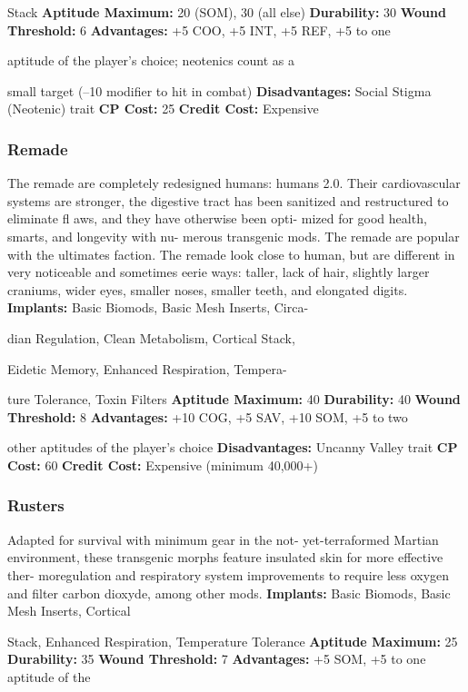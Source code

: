 Stack
\textbf{Aptitude Maximum: }20 (SOM), 30 (all else)
\textbf{Durability: }30
\textbf{Wound Threshold: }6
\textbf{Advantages:  }+5 COO, +5 INT, +5 REF, +5 to one 

aptitude of the player's choice; neotenics count as a 

small target (–10 modifier to hit in combat)
\textbf{Disadvantages: }Social Stigma (Neotenic) trait
\textbf{CP Cost:} 25
\textbf{Credit Cost: }Expensive

\subsubsection{Remade}

The remade are completely redesigned humans: 
humans 2.0. Their cardiovascular systems are stronger, 
the digestive tract has been sanitized and restructured 
to eliminate fl aws, and they have otherwise been opti-
mized for good health, smarts, and longevity with nu-
merous transgenic mods. The remade are popular with 
the ultimates faction. The remade look close to human, 
but are different in very noticeable and sometimes eerie 
ways: taller, lack of hair, slightly larger craniums, wider 
eyes, smaller noses, smaller teeth, and elongated digits.
\textbf{Implants: }Basic Biomods, Basic Mesh Inserts, Circa-

dian Regulation, Clean Metabolism, Cortical Stack, 

Eidetic Memory, Enhanced Respiration, Tempera-

ture Tolerance, Toxin Filters
\textbf{Aptitude Maximum: }40
\textbf{Durability:} 40
\textbf{Wound Threshold: }8
\textbf{Advantages:} +10 COG, +5 SAV, +10 SOM, +5 to two 

other aptitudes of the player's choice
\textbf{Disadvantages: }Uncanny Valley trait
\textbf{CP Cost:} 60
\textbf{Credit Cost: }Expensive (minimum 40,000+)

\subsubsection{Rusters}

Adapted for survival with minimum gear in the not-
yet-terraformed Martian environment, these transgenic 
morphs feature insulated skin for more effective ther-
moregulation and respiratory system improvements to 
require less oxygen and filter carbon dioxyde, among 
other mods.
\textbf{Implants: }Basic Biomods, Basic Mesh Inserts, Cortical 

Stack, Enhanced Respiration, Temperature Tolerance
\textbf{Aptitude Maximum: }25
\textbf{Durability: }35
\textbf{Wound Threshold: }7
\textbf{Advantages:} +5 SOM, +5 to one aptitude of the 

